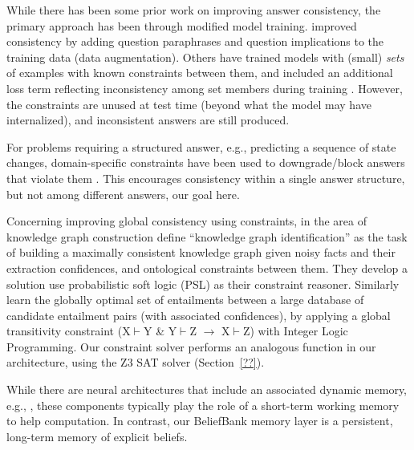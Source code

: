 \documentclass[11pt]{article}
\newcommand{\red}[1]{\textcolor{red}{#1}}
\begin{document}
While there has been some prior work on improving answer consistency, the primary approach
has been through modified model training. \citet{Ribeiro2019AreRR} improved consistency
by adding question paraphrases and question implications to the training data (data augmentation).
Others have trained models with (small) {\it sets} of examples with known constraints
between them, and included an additional loss term reflecting inconsistency among
set members during training \cite{Minervini2018AdversariallyRN,Li2019ALF,Asai2020LogicGuidedDA}.
However, the constraints are unused at test time (beyond what the model may have
internalized), and inconsistent answers are still produced.

For problems requiring a structured answer, e.g., predicting a sequence of
state changes, domain-specific constraints have been used to downgrade/block
answers that violate them \cite{Tandon2018ReasoningAA,Du2019BeCI}. This
encourages consistency within a single answer structure, but not among
different answers, our goal here.

Concerning improving global consistency using constraints,
in the area of knowledge graph construction
\citet{Pujara2013KnowledgeGI} define ``knowledge graph identification''
as the task of building a maximally consistent knowledge graph given noisy facts
and their extraction confidences, and ontological constraints between them.
They develop a solution use probabilistic soft logic (PSL) \cite{Broecheler2010ProbabilisticSL}
as their constraint reasoner. 
Similarly \citet{berant2010global} learn the globally
optimal set of entailments between a large database of candidate
entailment pairs (with associated confidences), by applying
a global transitivity constraint (X$\vdash$Y \& Y$\vdash$Z $\rightarrow$ X$\vdash$Z)
with Integer Logic Programming. Our constraint solver performs an analogous
function in our architecture, using the Z3 SAT solver (Section~\ref{??}).

While there are neural architectures that include an associated dynamic memory,
e.g., \cite{Henaff2017TrackingTW,Sukhbaatar2015EndToEndMN}, these components
typically play the role of a short-term working memory to help computation.
In contrast, our BeliefBank memory layer is a persistent, long-term memory of
explicit beliefs.

\end{document}

